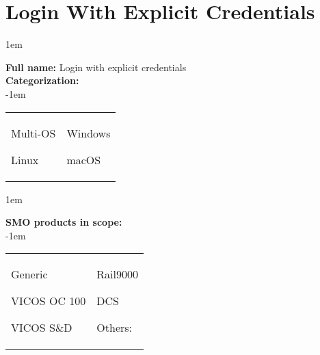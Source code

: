 
%
%

\section{Login With Explicit Credentials}
\label{15012}

\openup 1em

\textbf{Full name:} Login with explicit credentials\hrulefill \\
{\bf Categorization:} \\

\openup -1em
\vspace{-3em}

\begin{tabular}{p{}p{}}

\begin{todolist}
  	\item Multi-OS
	\item Linux
\end{todolist}
&
\begin{todolist}
	\item[\done] Windows
	\item macOS
\end{todolist}

\end{tabular}

\openup 1em

{\bf SMO products in scope:} \\

\openup -1em
\vspace{-3em}

\begin{tabular}{p{}p{}}

\begin{todolist}
  \item[\done] Generic
  \item VICOS OC 100
  \item VICOS S\&D
\end{todolist}
&
\begin{todolist}
  \item Rail9000
  \item DCS
  \item Others: \hrulefill
\end{todolist}

\end{tabular}

